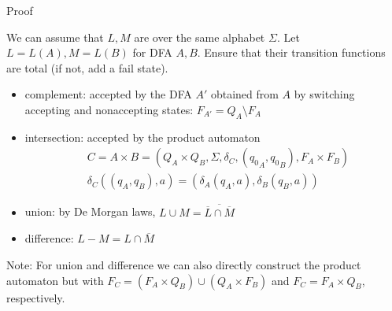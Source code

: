 \documentclass[handout]{beamer}
\begin{document}
\begin{frame}{Proof}

    We can assume that $L,M$ are over the same alphabet $\Sigma$. Let $L=L(A),M=L(B)$ for DFA $A,B$. Ensure that their transition functions are total (if not, add a fail state).
    \begin{itemize}
        \item \alert{complement}: accepted by the DFA $A'$ obtained from $A$ by switching accepting and nonaccepting states: $F_{A'}=Q_A\setminus F_A$
        \item \alert{intersection}: accepted by the \alert{product automaton}
        \begin{align*}
            & C=A\times B=(Q_A\times Q_B,\Sigma,\delta_C,({q_0}_A,{q_0}_B),F_A\times F_B)\\
            & \delta_C((q_A,q_B),a)=(\delta_A(q_A,a),\delta_B(q_B,a))            
        \end{align*}    
        \item \alert{union}: by De Morgan laws, $L \cup M=\overline{\overline{L}\cap \overline{M}}$
        \item \alert{difference}: $L-M=L\cap \overline{M}$\hfill\qedsymbol
    \end{itemize}
    
    Note: For union and difference we can also directly construct the product automaton but with $F_C=(F_A\times Q_B)\cup(Q_A\times F_B)$ and $F_C=F_A\times Q_B$, respectively.

\end{frame}
\end{document}
